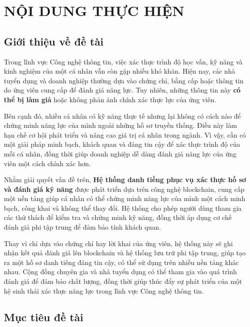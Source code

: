 \documentclass{article}[14pt]
\begin{document}
    \section{NỘI DUNG THỰC HIỆN}
    {
        
    \subsection{Giới thiệu về đề tài}
    
    Trong lĩnh vực Công nghệ thông tin, việc xác thực trình độ học vấn, kỹ năng và kinh nghiệm của một cá nhân vẫn còn gặp nhiều khó khăn. 
    Hiện nay, các nhà tuyển dụng và doanh nghiệp thường dựa vào chứng chỉ, bằng cấp hoặc thông tin do ứng viên cung cấp để đánh giá năng lực. 
    Tuy nhiên, những thông tin này \textbf{có thể bị làm giả} hoặc không phản ánh chính xác thực lực của ứng viên.

    Bên cạnh đó, nhiều cá nhân có kỹ năng thực tế nhưng lại không có cách nào để chứng minh năng lực của mình ngoài những hồ sơ truyền thống. 
    Điều này làm hạn chế cơ hội phát triển và nâng cao giá trị cá nhân trong ngành. 
    Vì vậy, cần có một giải pháp minh bạch, khách quan và đáng tin cậy để xác thực trình độ của mỗi cá nhân, 
    đồng thời giúp doanh nghiệp dễ dàng đánh giá năng lực của ứng viên một cách chính xác hơn.

    Nhằm giải quyết vấn đề trên, \textbf{Hệ thống danh tiếng phục vụ xác thực hồ sơ và đánh giá kỹ năng} được phát triển dựa trên công nghệ blockchain, 
    cung cấp một nền tảng giúp cá nhân có thể chứng minh năng lực của mình một cách minh bạch, công khai và không thể thay đổi. 
    Hệ thống cho phép người dùng tham gia các thử thách để kiểm tra và chứng minh kỹ năng, đồng thời áp dụng cơ chế đánh giá phi tập trung để đảm bảo tính khách quan.

    Thay vì chỉ dựa vào chứng chỉ hay lời khai của ứng viên, hệ thống này sẽ ghi nhận kết quả đánh giá lên blockchain và hệ thống lưu trữ phi tập trung, 
    giúp tạo ra một hồ sơ danh tiếng đáng tin cậy, có thể sử dụng trên nhiều nền tảng khác nhau. 
    Cộng đồng chuyên gia và nhà tuyển dụng có thể tham gia vào quá trình đánh giá để đảm bảo chất lượng, 
    đồng thời giúp thúc đẩy sự phát triển của một hệ sinh thái xác thực năng lực trong lĩnh vực Công nghệ thông tin.
    
    \subsection{Mục tiêu đề tài}

}
\end{document}
